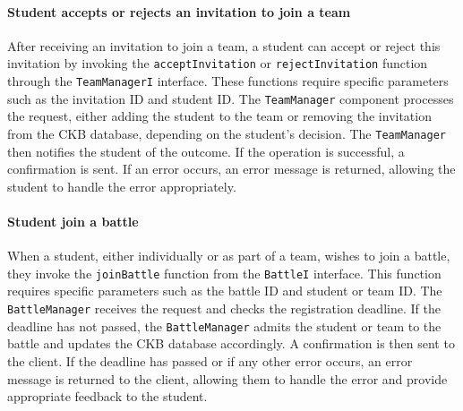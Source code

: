 \paragraph{Student accepts or rejects an invitation to join a team}
After receiving an invitation to join a team, a student can accept or reject this invitation by invoking the \verb|acceptInvitation| or \verb|rejectInvitation| function through the \verb|TeamManagerI| interface. 
These functions require specific parameters such as the invitation ID and student ID. The \verb|TeamManager| component processes the request, either adding the student to the team or removing the invitation from the CKB database, depending on the student's decision. 
The \verb|TeamManager| then notifies the student of the outcome. If the operation is successful, a confirmation is sent. If an error occurs, an error message is returned, allowing the student to handle the error appropriately.

\paragraph{Student join a battle}
When a student, either individually or as part of a team, wishes to join a battle, they invoke the \verb|joinBattle| function from the \verb|BattleI| interface. This function requires specific parameters such as the battle ID and student or team ID. 
The \verb|BattleManager| receives the request and checks the registration deadline. If the deadline has not passed, the \verb|BattleManager| admits the student or team to the battle and updates the CKB database accordingly. A confirmation is then sent to the client. 
If the deadline has passed or if any other error occurs, an error message is returned to the client, allowing them to handle the error and provide appropriate feedback to the student.

